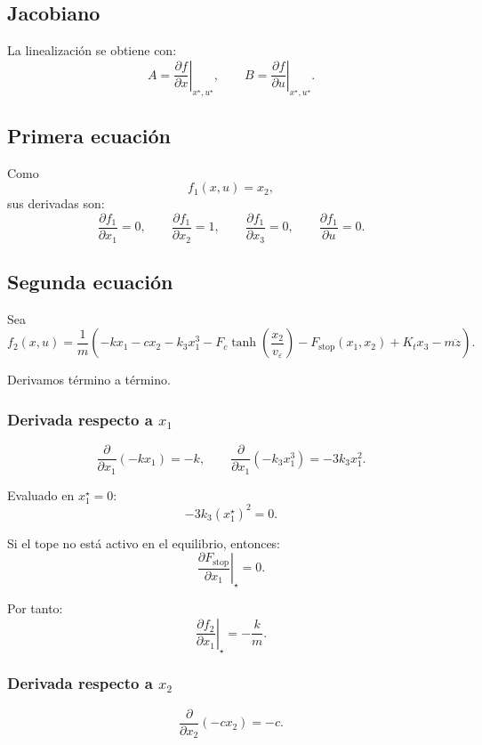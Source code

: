 \documentclass[11pt]{article}
\begin{document}
\subsection{Jacobiano}

La linealizaci\'on se obtiene con:
\[
A = \left.\frac{\partial f}{\partial x}\right|_{x^\star,u^\star},
\qquad
B = \left.\frac{\partial f}{\partial u}\right|_{x^\star,u^\star}.
\]

\subsection{Primera ecuaci\'on}

Como
\[
f_1(x,u)=x_2,
\]
sus derivadas son:
\[
\frac{\partial f_1}{\partial x_1}=0,\qquad
\frac{\partial f_1}{\partial x_2}=1,\qquad
\frac{\partial f_1}{\partial x_3}=0,\qquad
\frac{\partial f_1}{\partial u}=0.
\]

\subsection{Segunda ecuaci\'on}

Sea
\[
f_2(x,u)=
\frac{1}{m}\left(
-kx_1 - cx_2 - k_3x_1^3 - F_c\tanh\left(\frac{x_2}{v_\varepsilon}\right)
-F_{\text{stop}}(x_1,x_2) + K_t x_3 - m\ddot z
\right).
\]

Derivamos t\'ermino a t\'ermino.

\subsubsection{Derivada respecto a $x_1$}

\[
\frac{\partial}{\partial x_1}(-kx_1)=-k,
\qquad
\frac{\partial}{\partial x_1}(-k_3x_1^3)=-3k_3x_1^2.
\]

Evaluado en $x_1^\star=0$:
\[
-3k_3(x_1^\star)^2 = 0.
\]

Si el tope no est\'a activo en el equilibrio, entonces:
\[
\left.\frac{\partial F_{\text{stop}}}{\partial x_1}\right|_\star = 0.
\]

Por tanto:
\begin{equation}
\left.\frac{\partial f_2}{\partial x_1}\right|_\star = -\frac{k}{m}.
\end{equation}

\subsubsection{Derivada respecto a $x_2$}

\[
\frac{\partial}{\partial x_2}(-cx_2)=-c.
\]
\end{document}
